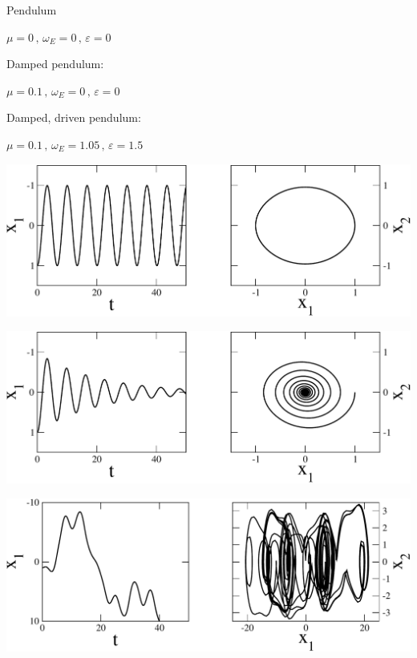 \begin{frame}[fragile]

 \vspace{2ex}

\begin{minipage}[t]{0.5\textwidth}
\vspace{0pt}
Pendulum

\vspace{1ex}
$\mu=0 \, \text{,} \,\, \omega_E = 0 \, \text{,} \,\, \varepsilon=0$

\vspace{7ex}
Damped pendulum:

\vspace{1ex}
$\mu=0.1  \, \text{,} \,\, \omega_E = 0  \, \text{,} \,\, \varepsilon=0$

\vspace{7ex}
Damped, driven pendulum:

\vspace{1ex}
$\mu=0.1  \, \text{,} \,\, \omega_E = 1.05  \, \text{,} \,\, \varepsilon=1.5$
\end{minipage} %
\begin{minipage}[t]{0.49\textwidth}
\vspace{0pt}
\centerline{\includegraphics[draft=false,width=1.0\textwidth]{undamped.pdf}}

\vspace{2.5ex}
\centerline{\includegraphics[draft=false,width=1.0\textwidth]{damped.pdf}}

\vspace{2.5ex}
\centerline{\includegraphics[draft=false,width=1.0\textwidth]{damped_driven.pdf}}
\end{minipage}


\end{frame}
